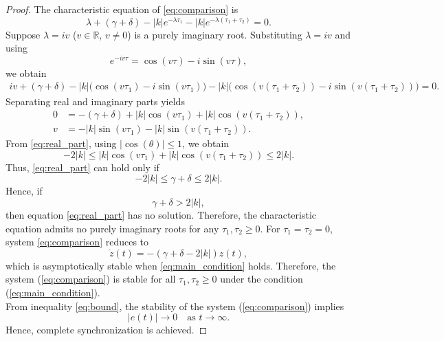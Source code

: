\documentclass[11pt]{article}
\theoremstyle{remark}
\begin{document}
\begin{proof}
	The characteristic equation of \eqref{eq:comparison} is
	\[
	\lambda + (\gamma+\delta)
	- |k| e^{-\lambda\tau_1}
	- |k| e^{-\lambda(\tau_1+\tau_2)}=0.
	\]
	Suppose $\lambda = iv$ ($v \in \mathbb{R}$, $v\neq 0$) is a purely imaginary root.
	Substituting $\lambda = iv$ and using
	\[
	e^{-iv\tau}=\cos(v\tau)-i\sin(v\tau),
	\]
	we obtain
	\begin{align*}
		iv + (\gamma+\delta)
		- |k|\big(\cos(v\tau_1)-i\sin(v\tau_1)\big)  
		- |k|\big(\cos(v(\tau_1+\tau_2))
		- i\sin(v(\tau_1+\tau_2))\big)=0.
	\end{align*}
	Separating real and imaginary parts yields
	\begin{align}
		0 &= -(\gamma+\delta)
		+ |k|\cos(v\tau_1)
		+ |k|\cos(v(\tau_1+\tau_2)), 
		\label{eq:real_part} \\
		v &= - |k|\sin(v\tau_1)
		- |k|\sin(v(\tau_1+\tau_2)).
		\label{eq:imag_part}
	\end{align}	
	From \eqref{eq:real_part}, using $|\cos(\theta)|\le 1$, we obtain
	\[
-2|k| \le |k|\cos(v\tau_1)
	+ |k|\cos(v(\tau_1+\tau_2))
	\le 2|k|.
	\]	
	Thus, \eqref{eq:real_part} can hold only if
	\[
-2|k| \le \gamma+\delta \le 2|k|.
	\]	
	Hence, if
	\[
	\gamma+\delta > 2|k|,
	\]
	then equation \eqref{eq:real_part} has no solution.
	Therefore, the characteristic equation admits no purely imaginary roots
	for any $\tau_1,\tau_2 \ge 0$.
	For $\tau_1=\tau_2=0$, system \eqref{eq:comparison} reduces to
	\[
	\dot z(t)=-(\gamma+\delta-2|k|)z(t),
	\]
which is asymptotically stable when \eqref{eq:main_condition} holds. Therefore, the system (\ref{eq:comparison}) is stable for all $\tau_1,\tau_2\ge0$ under the condition (\ref{eq:main_condition}).\\ From inequality \eqref{eq:bound}, the  stability of the system (\ref{eq:comparison}) implies \[ |e(t)|\to 0 \quad \text{as } t\to\infty. \] Hence, complete synchronization is achieved. 
 \medskip \noindent
\end{proof}
\end{document}
